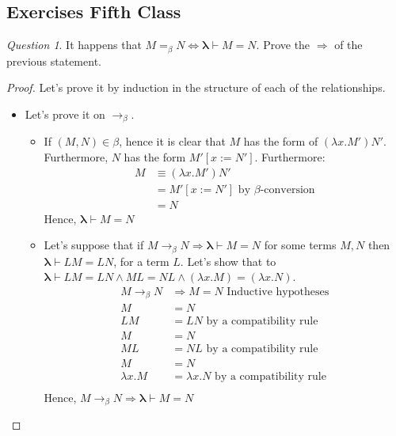 \documentclass[11pt]{article}
\theoremstyle{definition}
\theoremstyle{remark}
\theoremstyle{remark}
\newtheorem{question}{Question}
\theoremstyle{definition}
\begin{document}
\subsection{Exercises Fifth Class}
\begin{question}
  It happens that $M =_\beta N \iff \pmb{\lambda} \vdash M = N$. Prove the
  $\Rightarrow$ of the previous statement.
\end{question}
\begin{proof}
  Let's prove it by induction in the structure of each of the relationships.
  \begin{itemize}
    \item Let's prove it on $\rightarrow_\beta$.
          \begin{itemize}
            \item If $(M, N) \in \beta$, hence it is clear that $M$ has the form
                  of $(\lambda x. M')N'$. Furthermore, $N$ has the form
                  $M'[x := N']$. Furthermore:
                  \begin{align*}
                    M &\equiv (\lambda x. M')N' \\
                      &= M'[x := N'] \text{ by } \beta\text{-conversion} \\
                      &= N
                  \end{align*}
                  Hence, $\pmb{\lambda} \vdash M = N$

            \item Let's suppose that if
                  $M \rightarrow_\beta N \Rightarrow \pmb{\lambda} \vdash M = N$
                  for some terms $M, N$ then $\pmb{\lambda} \vdash LM = LN$, for
                  a term $L$. Let's show that to
                  $\pmb{\lambda} \vdash LM = LN \wedge ML = NL \wedge (\lambda x. M) = (\lambda x. N)$.
                  \begin{align*}
                    M \rightarrow_\beta N &\Rightarrow M = N
                                            \text{ Inductive hypotheses}\\
                    M &= N\\
                    LM &= LN \text{ by a compatibility rule} \\
                    M &= N\\
                    ML &= NL \text{ by a compatibility rule} \\
                    M &= N\\
                    \lambda x.M &= \lambda x. N \text{ by a compatibility rule} \\
                  \end{align*}
                  Hence,
                  $M \rightarrow_\beta N \Rightarrow \pmb{\lambda} \vdash M = N$
          \end{itemize}


\end{itemize}
\end{proof}
\end{document}
